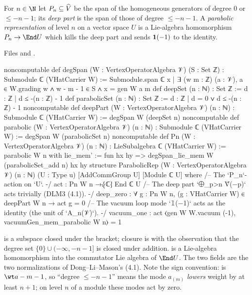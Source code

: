 \begin{definition}\label{l13:def:parabolicrep}
For $n\in\N$ let $P_n\subseteq\widehat{V}$ be the span of the homogeneous generators of degree $0$ or $\le-n-1$; its
\emph{deep part} is the span of those of degree $\le-n-1$. A \emph{parabolic representation} of level $n$ on a vector
space $U$ is a Lie-algebra homomorphism $P_n\to\End U$ which kills the deep part and sends $\mathbf{1}(-1)$ to the
identity.
\end{definition}
\noindent Files  and
.
\begin{leancode}
noncomputable def degSpan (W : VertexOperatorAlgebra 𝒱) (S : Set ℤ) :
    Submodule ℂ (VHatCarrier W) :=
  Submodule.span ℂ {x | ∃ (w m : ℤ) (a : 𝒱), a ∈ W.grading w ∧ w - m - 1 ∈ S ∧ x = gen W a m}
def deepSet (n : ℕ) : Set ℤ := {d : ℤ | d ≤ -(n : ℤ) - 1}
def parabolicSet (n : ℕ) : Set ℤ := {d : ℤ | d = 0 ∨ d ≤ -(n : ℤ) - 1}
noncomputable def deepPart (W : VertexOperatorAlgebra 𝒱) (n : ℕ) : Submodule ℂ (VHatCarrier W) :=
  degSpan W (deepSet n)
noncomputable def parabolic (W : VertexOperatorAlgebra 𝒱) (n : ℕ) : Submodule ℂ (VHatCarrier W) :=
  degSpan W (parabolicSet n)
noncomputable def Pn (W : VertexOperatorAlgebra 𝒱) (n : ℕ) : LieSubalgebra ℂ (VHatCarrier W) :=
  { parabolic W n with
    lie_mem' := fun hx hy => degSpan_lie_mem W (parabolicSet_add n) hx hy }
structure ParabolicRep (W : VertexOperatorAlgebra 𝒱) (n : ℕ) (U : Type u)
    [AddCommGroup U] [Module ℂ U] where
  /-- The `P_n`-action on `U`. -/
  act : Pn W n →ₗ⁅ℂ⁆ End ℂ U
  /-- The deep part `⨁_{p>n} V̂(−p)` acts trivially (DLM3 (4.1)). -/
  deep_zero : ∀ g : Pn W n, (g : VHatCarrier W) ∈ deepPart W n → act g = 0
  /-- The vacuum loop mode `𝟙(−1)` acts as the identity (the unit of `A_n(𝒱)`). -/
  vacuum_one : act ⟨gen W W.vacuum (-1), vacuumGen_mem_parabolic W n⟩ = 1
\end{leancode}

\begin{dictionary}
 is a subspace closed under the bracket; closure is  with the
observation that the degree set $\{0\}\cup(-\infty,-n-1]$ is closed under addition.  is a
Lie-algebra homomorphism into the commutator Lie algebra of $\End U$. The two fields are the two normalizations of
Dong--Li--Mason's (4.1). Note the sign convention:  is $\wt a - m - 1$, so ``degree $\le-n-1$'' means the mode
$a_{(m)}$ \emph{lowers} weight by at least $n+1$; on level $n$ of a module these modes act by zero.
\end{dictionary}

